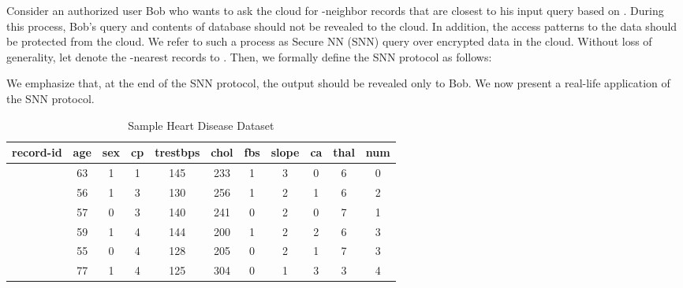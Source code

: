\documentclass{article}
\begin{document}
Consider an authorized user Bob who wants 
to ask the cloud for -neighbor records that are closest to his 
input query  based on . 
During this process, Bob's query  and contents of database  should not be 
revealed to the cloud. In addition, the access patterns to the data should be protected 
from the cloud. We refer 
to such a process as Secure NN (SNN) query over encrypted 
data in the cloud. Without loss of generality, let  denote 
the -nearest records to . Then, we formally define the SNN protocol as follows: 
 
We emphasize that, at the end of the SNN protocol, the output  should 
be revealed only to Bob. We now present a real-life application of the SNN protocol. 


\renewcommand{\tabcolsep}{.15cm}
\begin{table}[!t]
\centering
\caption{Sample Heart Disease Dataset } \begin{tabular}{ccccccccccc}  
     \hline\hline record-id &\;age&\;sex&\;cp&\;trestbps&\;chol&\;fbs&\;slope&\;ca&\;thal&\;num \\ [1ex] \hline  &63 & 1 & 1 & 145 & 233 & 1 & 3 & 0 &6 & 0  \\  & 56 & 1  & 3	&130& 256 & 1& 2 & 1 & 6&2\\
    	 & 57 & 0 & 3  & 140 & 241 & 0 & 2 & 0 & 7 & 1 \\
    	 & 59 & 1 & 4 & 144 & 200 & 1 & 2 & 2 & 6 & 3 \\
    	 & 55 & 0 & 4  & 128 & 205 & 0 & 2 & 1 &7 & 3 \\
    	 & 77 & 1 & 4 & 125 & 304 & 0 & 1 & 3 & 3 & 4 \\ [1ex] \hline \end{tabular}\label{table:example} \end{table} 
\end{document}
